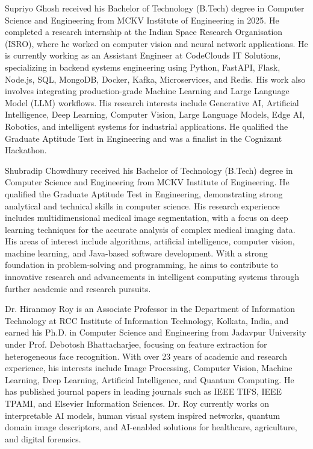 \documentclass[a4paper,fleqn]{cas-dc}
\begin{document}
\vspace*{-1\baselineskip}

{\sloppy Supriyo Ghosh received his Bachelor of Technology (B.Tech) degree in Computer Science and Engineering from MCKV Institute of Engineering in 2025. He completed a research internship at the Indian Space Research Organisation (ISRO), where he worked on computer vision and neural network applications. He is currently working as an Assistant Engineer at CodeClouds IT Solutions, specializing in backend systems engineering using Python, FastAPI, Flask, Node.js, SQL, MongoDB, Docker, Kafka, Microservices, and Redis. His work also involves integrating production-grade Machine Learning and Large Language Model (LLM) workflows. His research interests include Generative AI, Artificial Intelligence, Deep Learning, Computer Vision, Large Language Models, Edge AI, Robotics, and intelligent systems for industrial applications. He qualified the Graduate Aptitude Test in Engineering and was a finalist in the Cognizant Hackathon.\par}
\endbio

\vspace*{-1\baselineskip}

Shubradip Chowdhury received his Bachelor of Technology (B.Tech) degree in Computer Science and Engineering from MCKV Institute of Engineering. He qualified the Graduate Aptitude Test in Engineering, demonstrating strong analytical and technical skills in computer science. His research experience includes multidimensional medical image segmentation, with a focus on deep learning techniques for the accurate analysis of complex medical imaging data. His areas of interest include algorithms, artificial intelligence, computer vision, machine learning, and Java-based software development. With a strong foundation in problem-solving and programming, he aims to contribute to innovative research and advancements in intelligent computing systems through further academic and research pursuits.
\endbio

\vspace*{-1\baselineskip}

Dr. Hiranmoy Roy is an Associate Professor in the Department of Information Technology at RCC Institute of Information Technology, Kolkata, India, and earned his Ph.D. in Computer Science and Engineering from Jadavpur University under Prof. Debotosh Bhattacharjee, focusing on feature extraction for heterogeneous face recognition. With over 23 years of academic and research experience, his interests include Image Processing, Computer Vision, Machine Learning, Deep Learning, Artificial Intelligence, and Quantum Computing. He has published journal papers in leading journals such as IEEE TIFS, IEEE TPAMI, and Elsevier Information Sciences. Dr. Roy currently works on interpretable AI models, human visual system inspired networks, quantum domain image descriptors, and AI-enabled solutions for healthcare, agriculture, and digital forensics.
\endbio
\end{document}
